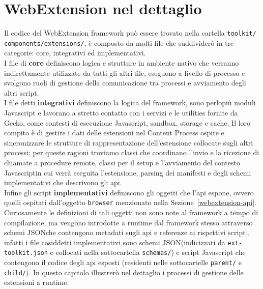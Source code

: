 \documentclass{sapthesis}
\newcommand{\bold}[1]{\textbf{#1}}
\newcommand{\code}[1]{\texttt{#1}}
\newcommand{\file}[1]{\code{#1}}
\newcommand{\Sezione}[1]{Sezione~\ref{#1}}
\newcommand{\JS}{Javascript}
\newcommand{\json}{JSON}
\begin{document}
\chapter{WebExtension nel dettaglio}
\label{cap:webextension-dettaglio}
    Il codice del WebExtension framework può essere trovato nella cartella \file{toolkit/} \file{components/extensions/}, è composto
    da molti file che suddividerò in tre categorie: core, integrativi ed implementativi.\\
    I file di \bold{core} definiscono logica e strutture in ambiente nativo che verranno indirettamente utilizzate da
    tutti gli altri file, eseguono a livello di processo e svolgono ruoli di gestione della comunicazione tra
    processi e avviamento degli altri script.\\
    I file detti \bold{integrativi} definiscono la logica del framework, sono perlopiù moduli \JS
    e lavorano a stretto contatto con i servizi e le utilities fornite da Gecko, come contesti di esecuzione \JS, sandbox, storage
    e cache. Il loro compito è di gestire i dati delle estensioni nel Content Process ospite e sincronizzare le strutture
    di rappresentazione dell'estensione collocate sugli altri processi; per queste ragioni troviamo classi che
    coordinano l'invio e la ricezione di chiamate a procedure remote, classi per il setup e l'avviamento
    del contesto \JS in cui verrà eseguita l'estensione, parsing dei manifesti e degli schemi implementativi
    che descrivono gli api.\\
    Infine gli script \bold{implementativi} definiscono gli oggetti che l'api espone, ovvero quelli ospitati
    dall'oggetto \code{browser} menzionato nella \Sezione{webextension-api}. Curiosamente le definizioni di tali
    oggetti non sono note al framework a tempo di compilazione, ma vengono introdotte a runtime dal framework stesso attraverso
    schemi \json che contengono metadati sugli api e referenze ai rispettivi script \cite{webextension-api-development}, infatti i file cosiddetti implementativi
    sono schemi \json (indicizzati da \file{ext-toolkit.json} e collocati nella sottocartella \file{schemas/}) e script \JS
    che contengono il codice degli api esposti (residenti nelle sottocartelle \file{parent/} e \file{child/}).
    In questo capitolo illustrerò nel dettaglio i processi di gestione delle estensioni a runtime. 
\end{document}
